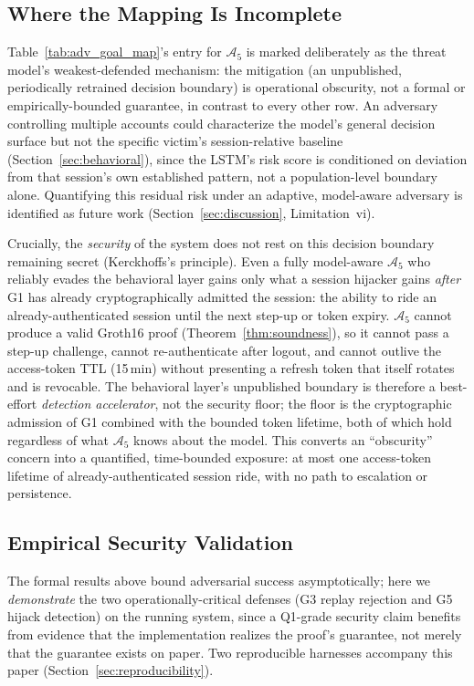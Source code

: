 \documentclass[journal,twoside,10pt]{IEEEtran}
\begin{document}
\subsection{Where the Mapping Is Incomplete}
Table~\ref{tab:adv_goal_map}'s entry for $\mathcal{A}_5$ is marked
deliberately as the threat model's weakest-defended mechanism: the
mitigation (an unpublished, periodically retrained decision boundary) is
operational obscurity, not a formal or empirically-bounded guarantee, in
contrast to every other row. An adversary controlling multiple accounts
could characterize the model's general decision surface but not the
specific victim's session-relative baseline (Section~\ref{sec:behavioral}),
since the LSTM's risk score is conditioned on deviation from that
session's own established pattern, not a population-level boundary alone.
Quantifying this residual risk under an adaptive, model-aware adversary is
identified as future work (Section~\ref{sec:discussion}, Limitation~vi).

Crucially, the \emph{security} of the system does not rest on this decision
boundary remaining secret (Kerckhoffs's principle). Even a fully
model-aware $\mathcal{A}_5$ who reliably evades the behavioral layer gains
only what a session hijacker gains \emph{after} G1 has already
cryptographically admitted the session: the ability to ride an
already-authenticated session until the next step-up or token expiry.
$\mathcal{A}_5$ cannot produce a valid Groth16 proof
(Theorem~\ref{thm:soundness}), so it cannot pass a step-up challenge,
cannot re-authenticate after logout, and cannot outlive the access-token
TTL (15\,min) without presenting a refresh token that itself rotates and is
revocable. The behavioral layer's unpublished boundary is therefore a
best-effort \emph{detection accelerator}, not the security floor; the floor
is the cryptographic admission of G1 combined with the bounded token
lifetime, both of which hold regardless of what $\mathcal{A}_5$ knows about
the model. This converts an ``obscurity'' concern into a quantified,
time-bounded exposure: at most one access-token lifetime of
already-authenticated session ride, with no path to escalation or
persistence.

\subsection{Empirical Security Validation}
\label{sec:empirical_validation}
The formal results above bound adversarial success asymptotically; here we
\emph{demonstrate} the two operationally-critical defenses (G3 replay
rejection and G5 hijack detection) on the running system, since a Q1-grade
security claim benefits from evidence that the implementation realizes the
proof's guarantee, not merely that the guarantee exists on paper. Two
reproducible harnesses accompany this paper
(Section~\ref{sec:reproducibility}).
\end{document}
